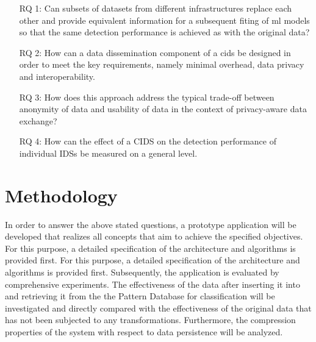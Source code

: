 \documentclass[../../main.tex]{subfiles}
\begin{document}
\begin{itemize}[leftmargin=6em]

    \item[RQ 1:] Can subsets of datasets from different infrastructures replace each other and provide equivalent information for a subsequent fiting of \gls{ml} models so that the same detection performance is achieved as with the original data? 
 
    \item[RQ 2:] How can a data dissemination component of a \gls{cids} be designed in order to meet the key requirements, namely minimal overhead, data privacy and interoperability.

    \item[RQ 3:] How does this approach address the typical trade-off between anonymity of data and usability of data in the context of privacy-aware data exchange?

    \item[RQ 4:] How can the effect of a CIDS on the detection performance of individual IDSs be measured on a general level.

  \end{itemize}

\section{Methodology}\label{sec:methodology}
In order to answer the above stated questions, a prototype application will be developed that realizes all concepts that aim to achieve the specified objectives. For this purpose, a detailed specification of the architecture and algorithms is provided first. For this purpose, a detailed specification of the architecture and algorithms is provided first. Subsequently, the application is evaluated by comprehensive experiments. The effectiveness of the data after inserting it into and retrieving it from the the Pattern Database for classification will be investigated and directly compared with the effectiveness of the original data that has not been subjected to any transformations. Furthermore, the compression properties of the system with respect to data persistence will be analyzed.
\end{document}

